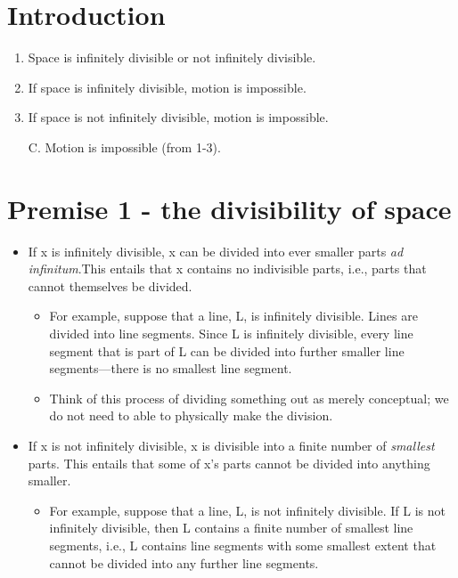 \documentclass[oneside]{article}
\begin{document}
\thispagestyle{fancy}

\section{Introduction}

\begin{enumerate}
\def\labelenumi{\arabic{enumi}.}
\item
  Space is infinitely divisible or not infinitely divisible.
\item
  If space is infinitely divisible, motion is impossible.
\item
  If space is not infinitely divisible, motion is impossible.
\item[C.]
  Motion is impossible (from 1-3).
\end{enumerate}

\section{Premise 1 - the divisibility of
space}\label{premise-1---the-divisibility-of-space}

\begin{itemize}
\item
  If x is infinitely divisible, x can be divided into ever smaller parts
  \emph{ad infinitum}.This entails that x contains no indivisible parts,
  i.e., parts that cannot themselves be divided.

  \begin{itemize}
  \item
    For example, suppose that a line, L, is infinitely divisible. Lines
    are divided into line segments. Since L is infinitely divisible, every line segment that is part of L can be
    divided into further smaller line segments---there is no smallest
    line segment.
  \item
    Think of this process of dividing something out as merely
    conceptual; we do not need to able to physically make the division.
  \end{itemize}
\item
  If x is not infinitely divisible, x is divisible into a finite
  number of \emph{smallest} parts. This entails that some of x's parts cannot be divided into anything smaller. 

  \begin{itemize}
  \itemsep1pt\parskip0pt
  \item
    For example, suppose that a line, L, is not infinitely divisible.
    If L is not infinitely divisible, then L contains a finite number of smallest line segments, i.e., L contains
    line segments with some smallest extent that cannot be divided into
    any further line segments.
  \end{itemize}
\end{itemize}
\end{document}
